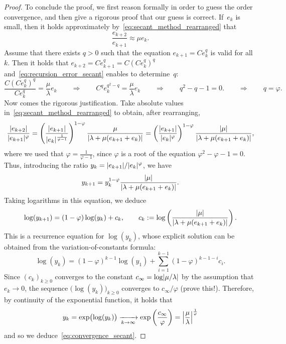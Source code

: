 \begin{proof}
    To conclude the proof,
    we first reason formally in order to guess the order convergence,
    and then give a rigorous proof that our guess is correct.
    If~$e_k$ is small, then it holds approximately by~\eqref{eq:secant_method_rearranged} that
    \begin{equation}
        \label{eq:recursion_error_secant}
        \frac{e_{k+2}}{e_{k+1}}
        \approx \mu e_k.
    \end{equation}
    Assume that there exists $q > 0$ such that the equation $e_{k+1} = C e_k^q$ is valid for all~$k$.
    Then it holds that $e_{k+2} = C e_{k+1}^q = C (Ce_k^{q})^q$ and~\eqref{eq:recursion_error_secant} enables to determine~$q$:
    \[
        \frac{C (Ce_k^{q})^q} {Ce_k^{q}} = \frac{\mu}{\lambda} e_k
        \qquad \Rightarrow \qquad
        C^q e_k^{q^2 - q} = \frac{\mu}{\lambda} e_k
        \qquad \Rightarrow \qquad
        q^2 - q - 1 = 0.
        \qquad \Rightarrow \qquad
        q = \varphi.
    \]
    Now comes the rigorous justification.
    Take absolute values in~\eqref{eq:secant_method_rearranged} to obtain,
    after rearranging,
    \[
        \frac{\abs{e_{k+2}}}{\abs{e_{k+1}}^{\varphi}}
        =  \left( \frac{\abs{e_{k+1}}}{\abs{e_{k}}^{\frac{1}{\varphi -1}}}  \right)^{1 - \varphi} \frac{\mu}{\abs{\lambda + \mu (e_{k+1} + e_k)}}
        =  \left( \frac{\abs{e_{k+1}}}{\abs{e_{k}}^{\varphi}}  \right)^{1 - \varphi} \frac{\abs{\mu}}{\abs{\lambda + \mu (e_{k+1} + e_k)}},
    \]
    where we used that $\varphi = \frac{1}{\varphi- 1}$,
    since $\varphi$ is a root of the equation $\varphi^2 - \varphi - 1 = 0$.
    Thus, introducing the ratio $y_k = \abs{e_{k+1}}/\abs{e_k}^{\varphi}$,
    we have
    \[
        y_{k+1} = y_k^{1 - \varphi} \frac{\abs{\mu}}{\abs{\lambda + \mu (e_{k+1} + e_k)}}.
    \]
    Taking logarithms in this equation,
    we deduce
    \[
        \log(y_{k+1}) = (1 - \varphi) \log(y_k) + c_k,
        \qquad c_k := \log \left( \frac{\abs{\mu}}{\abs{\lambda + \mu (e_{k+1} + e_k)}} \right).
    \]
    This is a recurrence equation for $\log(y_k)$,
    whose explicit solution can be obtained from the variation-of-constants formula:
    \[
        \log(y_k) = (1 - \varphi)^{k-1} \log(y_1) + \sum_{i=1}^{k-1} (1 - \varphi)^{k-1-i} c_i.
    \]
    Since $(c_k)_{k \geq 0}$ converges to the constant $c_{\infty} = \log\abs{\mu/\lambda}$ by the assumption that $e_k \to 0$,
    the sequence $\bigl(\log(y_k)\bigr)_{k\geq 0}$ converges to $c_{\infty} / \varphi$ (prove this!).
    Therefore, by continuity of the exponential function,
    it holds that
    \[
        y_k =  \exp \bigl(  \log(y_k) \bigr) \xrightarrow[k \to \infty]{} \exp \left( \frac{c_{\infty}}{\varphi} \right)
        = \abs*{\frac{\mu}{\lambda}}^{\frac{1}{\varphi}}
    \]
    and so we deduce~\eqref{eq:convergence_secant}.
\end{proof}

